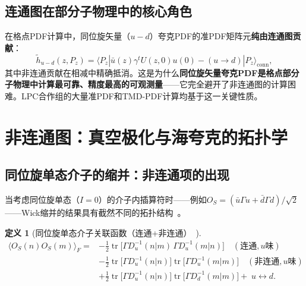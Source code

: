 \documentclass[12pt,a4paper]{ctexart}
\theoremstyle{definition}
\newtheorem{definition}{定义}[section]
\begin{document}
\subsection{连通图在部分子物理中的核心角色}

在格点PDF计算中，同位旋矢量（$u-d$）夸克PDF的准PDF矩阵元\textbf{纯由连通图贡献}：
\begin{equation}
\tilde h_{u-d}(z, P_z) = \langle P_z | \bar u(z)\gamma^t U(z,0) u(0) - (u\to d) | P_z \rangle_{\text{conn}},
\label{eq:isovector_PDF_connected}
\end{equation}
其中非连通贡献在相减中精确抵消。这是为什么\textbf{同位旋矢量夸克PDF是格点部分子物理中计算最可靠、精度最高的可观测量}——它完全避开了非连通图的计算困难。LPC合作组的大量准PDF和TMD-PDF计算均基于这一关键性质。

\section{非连通图：真空极化与海夸克的拓扑学}

\subsection{同位旋单态介子的缩并：非连通项的出现}

当考虑同位旋单态（$I=0$）的介子内插算符时——例如$O_S = (\bar u\Gamma u + \bar d\Gamma d)/\sqrt{2}$——Wick缩并的结果具有截然不同的拓扑结构~\cite{GattringerLang2010}。

\begin{definition}[同位旋单态介子关联函数（连通+非连通）~\cite{GattringerLang2010}]
\begin{equation}
\begin{aligned}
\boxed{\langle O_S(n) O_S(m) \rangle_F} = &
-\frac{1}{2}\operatorname{tr}\!\big[\Gamma D_u^{-1}(n|m)\,\Gamma D_u^{-1}(m|n)\big] \quad (\text{连通}, u\text{味})\\
&-\frac{1}{2}\operatorname{tr}\!\big[\Gamma D_u^{-1}(n|n)\big]\operatorname{tr}\!\big[\Gamma D_u^{-1}(m|m)\big] \quad (\text{非连通}, u\text{味})\\
&+ \frac{1}{2}\operatorname{tr}\!\big[\Gamma D_u^{-1}(n|n)\big]\operatorname{tr}\!\big[\Gamma D_d^{-1}(m|m)\big] + \;u \leftrightarrow d.
\end{aligned}
\label{eq:singlet_correlator}
\end{equation}
\end{definition}
\end{document}
